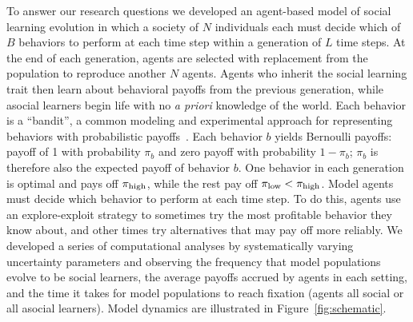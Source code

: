 \documentclass[letterpaper,11.5pt]{scrartcl}
\begin{document}
To answer our research questions we developed an agent-based model of social
learning evolution in which a society of $N$ individuals each must decide which of
$B$ behaviors to perform at each time step within a generation of $L$ time steps. At
the end of each generation, agents are selected with replacement from the population
to reproduce another $N$ agents. Agents who inherit the social learning trait then
learn about behavioral payoffs from the previous generation, while asocial learners
begin life with no \emph{a priori} knowledge of the world.  Each behavior is a
``bandit'', a common modeling and experimental approach for representing behaviors
with probabilistic
payoffs~\cite{SuttonBartoBook,McElreath2005,Rendell2010,Schulz2019}.  Each behavior
$b$ yields Bernoulli payoffs: payoff of 1 with probability $\pi_b$ and zero payoff
with probability $1 - \pi_b$; $\pi_b$ is therefore also the expected payoff of
behavior $b$. One behavior in each generation is optimal and pays off $\pi_{\mathrm{high}}$,
while the rest pay off $\pi_{\mathrm{low}} < \pi_{\mathrm{high}}$.  Model agents must decide which behavior
to perform at each time step.  To do this, agents use an explore-exploit strategy to
sometimes try the most profitable behavior they know about, and other times try
alternatives that may pay off more reliably.  We developed a series of computational
analyses by systematically varying uncertainty parameters and observing the
frequency that model populations evolve to be social learners, the average payoffs
accrued by agents in each setting, and the time it takes for model populations to
reach fixation (agents all social or all asocial learners). Model dynamics are
illustrated in Figure~\ref{fig:schematic}.
\end{document}
